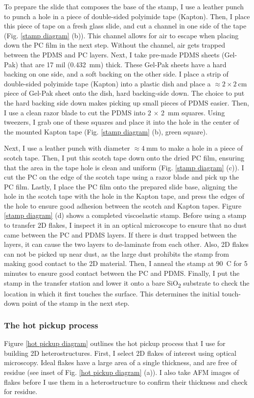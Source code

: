 \documentclass[double,12pt,1in]{beavtex}
\begin{document}
To prepare the slide that composes the base of the stamp, I use a leather punch to punch a hole in a piece of double-sided polyimide tape (Kapton). Then, I place this piece of tape on a fresh glass slide, and cut a channel in one side of the tape (Fig. \ref{stamp diagram} (b)). This channel allows for air to escape when placing down the PC film in the next step. Without the channel, air gets trapped between the PDMS and PC layers. Next, I take pre-made PDMS sheets (Gel-Pak) that are 17 mil (\SI{0.432}{\milli\meter}) thick. These Gel-Pak sheets have a hard backing on one side, and a soft backing on the other side. I place a strip of double-sided polyimide tape (Kapton) into a plastic dish and place a $\approx 2 \times \SI{2}{\centi\meter}$ piece of Gel-Pak sheet onto the dish, hard backing-side down. The choice to put the hard backing side down makes picking up small pieces of PDMS easier. Then, I use a clean razor blade to cut the PDMS into 2 $\times$ \SI{2}{mm} squares. Using tweezers, I grab one of these squares and place it into the hole in the center of the mounted Kapton tape (Fig. \ref{stamp diagram} (b), green square).

Next, I use a leather punch with diameter $\approx  \SI{4}{\milli\meter}$ to make a hole in a piece of scotch tape. Then, I put this scotch tape down onto the dried PC film, ensuring that the area in the tape hole is clean and uniform (Fig. \ref{stamp diagram} (c)). I cut the PC on the edge of the scotch tape using a razor blade and pick up the PC film. Lastly, I place the PC film onto the prepared slide base, aligning the hole in the scotch tape with the hole in the Kapton tape, and press the edges of the hole to ensure good adhesion between the scotch and Kapton tapes. Figure \ref{stamp diagram} (d) shows a completed viscoelastic stamp. Before using a stamp to transfer 2D flakes, I inspect it in an optical microscope to ensure that no dust came between the PC and PDMS layers. If there is dust trapped between the layers, it can cause the two layers to de-laminate from each other. Also, 2D flakes can not be picked up near dust, as the large dust prohibits the stamp from making good contact to the 2D material. Then, I anneal the stamp at \SI{90}{C} for 5 minutes to ensure good contact between the PC and PDMS. Finally, I put the stamp in the transfer station and lower it onto a bare SiO\textsubscript{2} substrate to check the location in which it first touches the surface. This determines the initial touch-down point of the stamp in the next step.


\subsubsection{The hot pickup process} \label{the hot pickup proces}
Figure \ref{hot pickup diagram} outlines the hot pickup process that I use for building 2D heterostructures. First, I select 2D flakes of interest using optical microscopy. Ideal flakes have a large area of a single thickness, and are free of residue (see inset of Fig. \ref{hot pickup diagram} (a)). I also take AFM images of flakes before I use them in a heterostructure to confirm their thickness and check for residue. 
\end{document}
